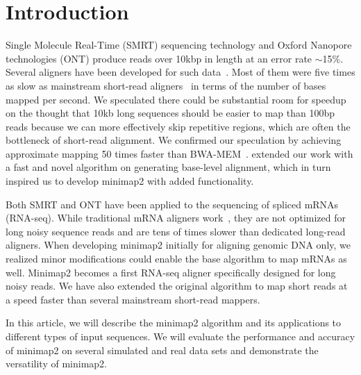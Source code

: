 \documentclass{bioinfo}
\begin{document}
\section{Introduction}

Single Molecule Real-Time (SMRT) sequencing technology and Oxford Nanopore
technologies (ONT) produce reads over 10kbp in length at an error rate
$\sim$15\%. Several aligners have been developed for such
data~\citep{Chaisson:2012aa,Li:2013aa,Liu:2016ab,Sovic:2016aa,Liu:2017aa,Lin:2017aa,Sedlazeck169557}.
Most of them were five times as slow as mainstream short-read
aligners~\citep{Langmead:2012fk,Li:2013aa} in terms of the number of bases
mapped per second. We speculated there could be substantial room for speedup on
the thought that 10kb long sequences should be easier to map than 100bp reads
because we can more effectively skip repetitive regions, which are often the
bottleneck of short-read alignment. We confirmed our speculation by achieving
approximate mapping 50 times faster than BWA-MEM~\citep{Li:2016aa}.
\citet{Suzuki:2018aa} extended our work with a fast and novel algorithm on
generating base-level alignment, which in turn inspired us to develop minimap2
with added functionality.

Both SMRT and ONT have been applied to the sequencing of spliced mRNAs (RNA-seq). While
traditional mRNA aligners work~\citep{Wu:2005vn,Iwata:2012aa}, they are not
optimized for long noisy sequence reads and are tens of times slower than
dedicated long-read aligners. When developing minimap2 initially for aligning
genomic DNA only, we realized minor modifications could enable the base
algorithm to map mRNAs as well. Minimap2 becomes a first RNA-seq aligner
specifically designed for long noisy reads. We have also extended the original
algorithm to map short reads at a speed faster than several mainstream
short-read mappers.

In this article, we will describe the minimap2 algorithm and its applications
to different types of input sequences. We will evaluate the performance and
accuracy of minimap2 on several simulated and real data sets and demonstrate
the versatility of minimap2.
\end{document}
